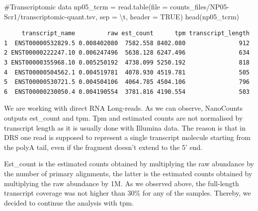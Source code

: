 \documentclass[
  letterpaper,
  DIV=11,
  numbers=noendperiod]{scrartcl}
\newenvironment{Shaded}{\begin{snugshade}}{\end{snugshade}}
\newcommand{\AttributeTok}[1]{\textcolor[rgb]{0.40,0.45,0.13}{#1}}
\newcommand{\CommentTok}[1]{\textcolor[rgb]{0.37,0.37,0.37}{#1}}
\newcommand{\ConstantTok}[1]{\textcolor[rgb]{0.56,0.35,0.01}{#1}}
\newcommand{\FunctionTok}[1]{\textcolor[rgb]{0.28,0.35,0.67}{#1}}
\newcommand{\NormalTok}[1]{\textcolor[rgb]{0.00,0.23,0.31}{#1}}
\newcommand{\OtherTok}[1]{\textcolor[rgb]{0.00,0.23,0.31}{#1}}
\newcommand{\SpecialCharTok}[1]{\textcolor[rgb]{0.37,0.37,0.37}{#1}}
\newcommand{\StringTok}[1]{\textcolor[rgb]{0.13,0.47,0.30}{#1}}
\begin{document}
\begin{Shaded}
\begin{Highlighting}[]
\CommentTok{\#Transcriptomic data}
\NormalTok{np05\_tcrm }\OtherTok{=} \FunctionTok{read.table}\NormalTok{(}\AttributeTok{file =} \StringTok{\textquotesingle{}counts\_files/NP05{-}Scr1/transcriptomic{-}quant.tsv\textquotesingle{}}\NormalTok{, }\AttributeTok{sep =} \StringTok{\textquotesingle{}}\SpecialCharTok{\textbackslash{}t}\StringTok{\textquotesingle{}}\NormalTok{, }\AttributeTok{header =} \ConstantTok{TRUE}\NormalTok{)}
\FunctionTok{head}\NormalTok{(np05\_tcrm)}
\end{Highlighting}
\end{Shaded}

\begin{verbatim}
     transcript_name         raw est_count      tpm transcript_length
1  ENST00000532829.5 0.008402080  7582.558 8402.080               912
2 ENST00000222247.10 0.006247496  5638.128 6247.496               634
3 ENST00000355968.10 0.005250192  4738.099 5250.192               818
4  ENST00000504562.1 0.004519781  4078.930 4519.781               505
5  ENST00000530721.5 0.004504106  4064.785 4504.106               796
6  ENST00000230050.4 0.004190554  3781.816 4190.554               503
\end{verbatim}

We are working with direct RNA Long-reads. As we can observe, NanoCounts
outputs est\_count and tpm. Tpm and estimated counts are not normalised
by transcript length as it is usually done with Illumina data. The
reason is that in DRS one read is supposed to represent a single
transcript molecule starting from the polyA tail, even if the fragment
doesn't extend to the 5' end.

Est\_count is the estimated counts obtained by multiplying the raw
abundance by the number of primary alignments, the latter is the
estimated counts obtained by multiplying the raw abundance by 1M. As we
observed above, the full-length transcript coverage was not higher than
30\% for any of the samples. Thereby, we decided to continue the
analysis with tpm.
\end{document}
